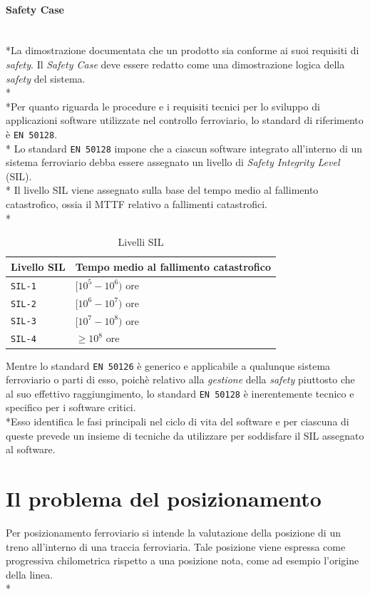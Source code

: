 \paragraph{Safety Case}\mbox{}\\*La dimostrazione documentata che un prodotto sia conforme ai suoi requisiti di \emph{safety}.
Il \emph{Safety Case} deve essere redatto come una dimostrazione logica della \emph{safety} del sistema.\\*\\*Per quanto riguarda le procedure e i requisiti tecnici per lo sviluppo di applicazioni software utilizzate nel controllo ferroviario, lo standard di riferimento \`e \texttt{EN 50128}. \cite{50128}\\*
Lo standard \texttt{EN 50128} impone che a ciascun software integrato all'interno di un sistema ferroviario debba essere assegnato un livello di \emph{Safety Integrity Level} (SIL). \cite{sil}\\*
Il livello SIL viene assegnato sulla base del tempo medio al fallimento catastrofico, ossia il MTTF relativo a fallimenti catastrofici.\\*
\begin{table}[h]
	\centering
	\begin{tabular}{|l|l|}
		\hline 
		\textbf{Livello SIL} & \textbf{Tempo medio al fallimento catastrofico} \\ 
		\hline 
		\texttt{SIL-1} & $[10^5 - 10^6)$ ore \\ 
		\hline 
		\texttt{SIL-2} & $[10^6 - 10^7)$ ore \\ 
		\hline 
		\texttt{SIL-3} & $[10^7 - 10^8)$ ore \\ 
		\hline 
		\texttt{SIL-4} & $\ge 10^8$ ore \\ 
		\hline 
	\end{tabular} 
\caption{Livelli SIL}
\end{table}
\FloatBarrier
\noindent{}Mentre lo standard \texttt{EN 50126} \`e generico e applicabile a qualunque sistema ferroviario o parti di esso, poich\`e relativo alla \emph{gestione} della \emph{safety} piuttosto che al suo effettivo raggiungimento, lo standard \texttt{EN 50128} \`e inerentemente tecnico e specifico per i software critici.\\*Esso identifica le fasi principali nel ciclo di vita del software e per ciascuna di queste prevede un insieme di tecniche da utilizzare per soddisfare il SIL assegnato al software.
\section{Il problema del posizionamento}
Per posizionamento ferroviario si intende la valutazione della posizione di un treno all'interno di una traccia ferroviaria. Tale posizione viene espressa come progressiva chilometrica rispetto a una posizione nota, come ad esempio l'origine della linea. \cite{trainpositioning}\\*
